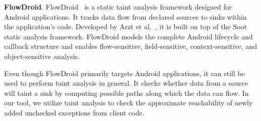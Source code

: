 \textbf{FlowDroid}. FlowDroid~\cite{Arzt14:_flowdroid} is a static taint analysis framework designed for Android applications. It tracks data flow from declared sources to sinks within the application's code. Developed by Arzt et al.~\cite{Arzt14:_flowdroid}, it is built on top of the Soot~\cite{vallee2010soot} static analysis framework. FlowDroid models the complete Android lifecycle and callback structure and enables flow-sensitive, field-sensitive, context-sensitive, and object-sensitive analysis.

Even though FlowDroid primarily targets Android applications, it can still be used to perform taint analysis in general. It checks whether data from a source will taint a sink by computing possible paths along which the data can flow. In our tool, we utilize taint analysis to check the approximate reachability of newly added unchecked exceptions from client code.